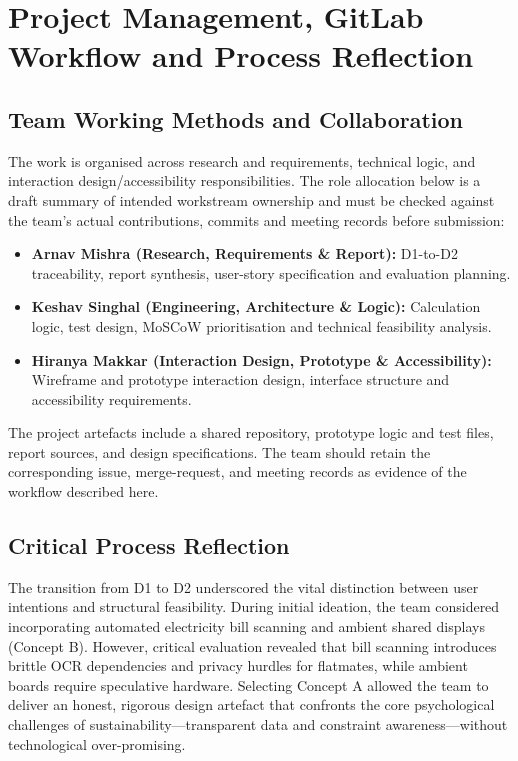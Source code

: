 \documentclass[12pt,a4paper]{article}
\begin{document}
\section{Project Management, GitLab Workflow and Process Reflection}

\subsection{Team Working Methods and Collaboration}
The work is organised across research and requirements, technical logic, and interaction design/accessibility responsibilities. The role allocation below is a draft summary of intended workstream ownership and must be checked against the team's actual contributions, commits and meeting records before submission:
\begin{itemize}[leftmargin=*]
  \item \textbf{Arnav Mishra (Research, Requirements \& Report):} D1-to-D2 traceability, report synthesis, user-story specification and evaluation planning.
  \item \textbf{Keshav Singhal (Engineering, Architecture \& Logic):} Calculation logic, test design, MoSCoW prioritisation and technical feasibility analysis.
  \item \textbf{Hiranya Makkar (Interaction Design, Prototype \& Accessibility):} Wireframe and prototype interaction design, interface structure and accessibility requirements.
\end{itemize}
The project artefacts include a shared repository, prototype logic and test files, report sources, and design specifications. The team should retain the corresponding issue, merge-request, and meeting records as evidence of the workflow described here.

\subsection{Critical Process Reflection}
The transition from D1 to D2 underscored the vital distinction between user intentions and structural feasibility. During initial ideation, the team considered incorporating automated electricity bill scanning and ambient shared displays (Concept B). However, critical evaluation revealed that bill scanning introduces brittle OCR dependencies and privacy hurdles for flatmates, while ambient boards require speculative hardware. Selecting Concept A allowed the team to deliver an honest, rigorous design artefact that confronts the core psychological challenges of sustainability—transparent data and constraint awareness—without technological over-promising.
\end{document}
